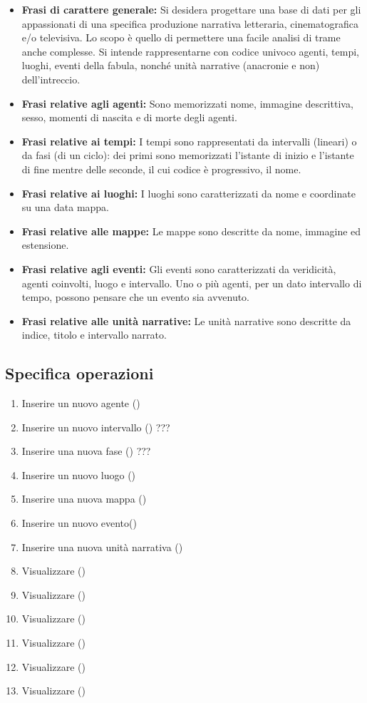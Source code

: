 \documentclass{article}
\begin{document}
\begin{itemize}
	\item \textbf{Frasi di carattere generale:}
	      Si desidera progettare una base di dati per gli appassionati di una
	      specifica produzione narrativa letteraria, cinematografica e/o
	      televisiva. Lo scopo è quello di permettere una facile analisi di trame
	      anche complesse. Si intende rappresentarne con codice univoco agenti,
	      tempi, luoghi, eventi della fabula, nonché unità narrative (anacronie e
	      non) dell'intreccio.
	\item \textbf{Frasi relative agli agenti:}
	      Sono memorizzati nome, immagine descrittiva, sesso, momenti di nascita e
	      di morte degli agenti.
	\item \textbf{Frasi relative ai tempi:}
	      I tempi sono rappresentati da intervalli (lineari) o da fasi (di un
	      ciclo): dei primi sono memorizzati l'istante di inizio e l'istante di
	      fine mentre delle seconde, il cui codice è progressivo, il nome.
	\item \textbf{Frasi relative ai luoghi:}
	      I luoghi sono caratterizzati da nome e coordinate su una data mappa.
	\item \textbf{Frasi relative alle mappe:}
	      Le mappe sono descritte da nome, immagine ed estensione.
	\item \textbf{Frasi relative agli eventi:}
	      Gli eventi sono caratterizzati da veridicità, agenti coinvolti, luogo e
	      intervallo. Uno o più agenti, per un dato intervallo di tempo, possono
	      pensare che un evento sia avvenuto.
	\item \textbf{Frasi relative alle unità narrative:}
	      Le unità narrative sono descritte da indice, titolo e intervallo narrato.
\end{itemize}

\subsection{Specifica operazioni}

\begin{enumerate}
	\item Inserire un nuovo agente ()
	\item Inserire un nuovo intervallo () ???
	\item Inserire una nuova fase () ???
	\item Inserire un nuovo luogo ()
	\item Inserire una nuova mappa ()
	\item Inserire un nuovo evento()
	\item Inserire una nuova unità narrativa ()
	\item Visualizzare ()
	\item Visualizzare ()
	\item Visualizzare ()
	\item Visualizzare ()
	\item Visualizzare ()
	\item Visualizzare ()
\end{enumerate}
\end{document}
